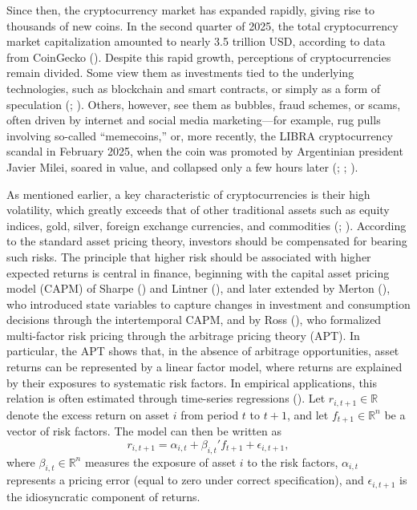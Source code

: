 \documentclass[
  12pt,
  a4paper,
  openany]{scrbook}
\begin{document}
Since then, the cryptocurrency market has expanded rapidly, giving rise
to thousands of new coins. In the second quarter of 2025, the total
cryptocurrency market capitalization amounted to nearly 3.5 trillion
USD, according to data from CoinGecko
(). Despite this rapid growth,
perceptions of cryptocurrencies remain divided. Some view them as
investments tied to the underlying technologies, such as blockchain and
smart contracts, or simply as a form of speculation
(;
).
Others, however, see them as bubbles, fraud schemes, or scams, often
driven by internet and social media marketing---for example, rug pulls
involving so-called ``memecoins,'' or, more recently, the LIBRA
cryptocurrency scandal in February 2025, when the coin was promoted by
Argentinian president Javier Milei, soared in value, and collapsed only
a few hours later (; ; ).

As mentioned earlier, a key characteristic of cryptocurrencies is their
high volatility, which greatly exceeds that of other traditional assets
such as equity indices, gold, silver, foreign exchange currencies, and
commodities (; ).
According to the standard asset pricing theory, investors should be
compensated for bearing such risks. The principle that higher risk
should be associated with higher expected returns is central in finance,
beginning with the capital asset pricing model (CAPM) of Sharpe
() and Lintner
(), and later extended by
Merton (), who
introduced state variables to capture changes in investment and
consumption decisions through the intertemporal CAPM, and by Ross
(), who formalized
multi-factor risk pricing through the arbitrage pricing theory (APT). In
particular, the APT shows that, in the absence of arbitrage
opportunities, asset returns can be represented by a linear factor
model, where returns are explained by their exposures to systematic risk
factors. In empirical applications, this relation is often estimated
through time-series regressions
(). Let
\(r_{i,t+1} \in \mathbb{R}\) denote the excess return on asset \(i\)
from period \(t\) to \(t+1\), and let \(f_{t+1} \in \mathbb{R}^n\) be a
vector of risk factors. The model can then be written as\\
\[
r_{i,t+1} = \alpha_{i,t} + \beta_{i,t}' f_{t+1} + \epsilon_{i,t+1},
\] where \(\beta_{i,t} \in \mathbb{R}^n\) measures the exposure of asset
\(i\) to the risk factors, \(\alpha_{i,t}\) represents a pricing error
(equal to zero under correct specification), and \(\epsilon_{i,t+1}\) is
the idiosyncratic component of returns.
\end{document}
